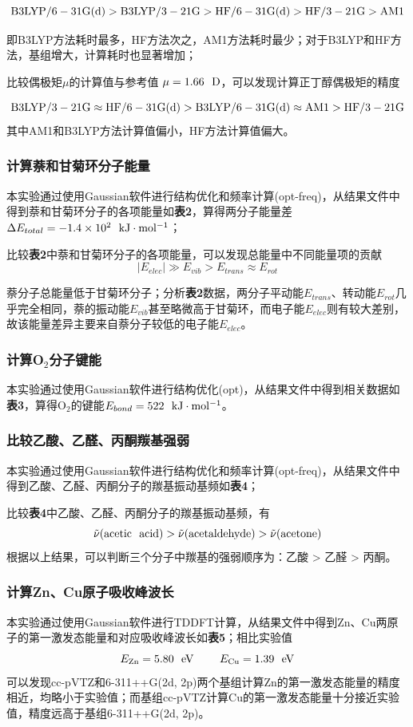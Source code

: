 \documentclass[12pt]{article}
\begin{document}
 			$$ \setlength{\abovedisplayskip}{-3pt} \rm B3LYP/6-31G(d) > B3LYP/3-21G > HF/6-31G(d) > HF/3-21G > AM1 $$
 
 	即B3LYP方法耗时最多，HF方法次之，AM1方法耗时最少；对于B3LYP和HF方法，基组增大，计算耗时也显著增加；\par
 		比较偶极矩$\mu$的计算值与参考值
 		\citealp{dean1992lange} 
 		$\mu=1.66\ \ {\rm D}$，可以发现计算正丁醇偶极矩的精度
 	
 		$$\setlength{\abovedisplayskip}{-3pt}\rm	B3LYP/3-21G \approx HF/6-31G(d) > B3LYP/6-31G(d) \approx AM1 > HF/3-21G $$
 	其中AM1和B3LYP方法计算值偏小，HF方法计算值偏大。
 		
 		\subsubsection{计算萘和甘菊环分子能量}
 		本实验通过使用Gaussian软件进行结构优化和频率计算(opt-freq)，从结果文件中得到萘和甘菊环分子的各项能量如\textbf{表2}，算得两分子能量差$\Delta E_{total}=-1.4\times10^{2} \ \ {\rm kJ \cdot mol^{-1} } $；\par
 		比较\textbf{表2}中萘和甘菊环分子的各项能量，可以发现总能量中不同能量项的贡献$$\vert E_{elec}\vert \gg E_{vib}>E_{trans}\approx E_{rot} $$\par
萘分子总能量低于甘菊环分子；分析\textbf{表2}数据，两分子平动能$E_{trans}$、转动能$E_{rot}$几乎完全相同，萘的振动能$E_{vib}$甚至略微高于甘菊环，而电子能$E_{elec}$则有较大差别，故该能量差异主要来自萘分子较低的电子能$E_{elec}$。
 		\subsubsection{计算O$_{2}$分子键能}
 		本实验通过使用Gaussian软件进行结构优化(opt)，从结果文件中得到相关数据如\textbf{表3}，算得O$_{2}$的键能$E_{bond}=522\ \ {\rm kJ \cdot mol^{-1}}$。\par
 		\subsubsection{比较乙酸、乙醛、丙酮羰基强弱}
 		本实验通过使用Gaussian软件进行结构优化和频率计算(opt-freq)，从结果文件中得到乙酸、乙醛、丙酮分子的羰基振动基频如\textbf{表4}；\par
 			比较\textbf{表4}中乙酸、乙醛、丙酮分子的羰基振动基频，有$$\tilde{\nu} {\rm (acetic \ \  acid)}>\tilde{\nu} {\rm (acetaldehyde)}>\tilde{\nu}{\rm (acetone)}$$根据以上结果，可以判断三个分子中羰基的强弱顺序为：乙酸 > 乙醛 > 丙酮。
 		\subsubsection{计算Zn、Cu原子吸收峰波长}
 		本实验通过使用Gaussian软件进行TDDFT计算，从结果文件中得到Zn、Cu两原子的第一激发态能量和对应吸收峰波长如\textbf{表5}；相比实验值\citealp{Bast2009,Konecny2019}
 		$$E_{\rm Zn}=5.80 \ \ {\rm eV}\ \ \ \ \ \ \ E_{\rm Cu}=1.39\ \ {\rm eV}$$
 		可以发现cc-pVTZ和6-311++G(2d, 2p)两个基组计算Zn的第一激发态能量的精度相近，均略小于实验值；而基组cc-pVTZ计算Cu的第一激发态能量十分接近实验值，精度远高于基组6-311++G(2d, 2p)。
 		
\end{document}
